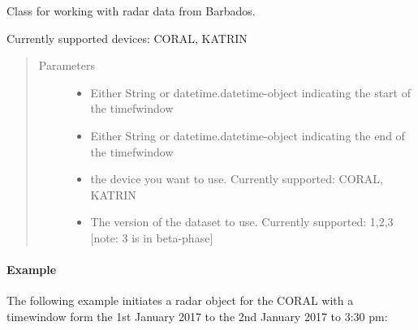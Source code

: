 \documentclass[letterpaper,10pt,english]{sphinxmanual}
\begin{document}
\begin{fulllineitems}
\label{\detokenize{generated/MPPy.Instruments.Radar.Radar:MPPy.Instruments.Radar.Radar}}
Class for working with radar data from Barbados.

Currently supported devices: CORAL, KATRIN
\begin{quote}\begin{description}
\item[{Parameters}] \leavevmode\begin{itemize}
\item {} 
 \textendash{} Either String or datetime.datetime-object indicating the start of the timefwindow

\item {} 
 \textendash{} Either String or datetime.datetime-object indicating the end of the timefwindow

\item {} 
 \textendash{} the device you want to use. Currently supported: CORAL, KATRIN

\item {} 
 \textendash{} The version of the dataset to use. Currently supported: 1,2,3  {[}note: 3 is in beta-phase{]}

\end{itemize}

\end{description}\end{quote}
\paragraph{Example}

The following example initiates a radar object for the CORAL with a timewindow form the 1st January 2017 to
the 2nd January 2017 to 3:30 pm:

\begin{sphinxVerbatim}[commandchars=\\\{\}]
   
\end{sphinxVerbatim}


\end{fulllineitems}
\end{document}

